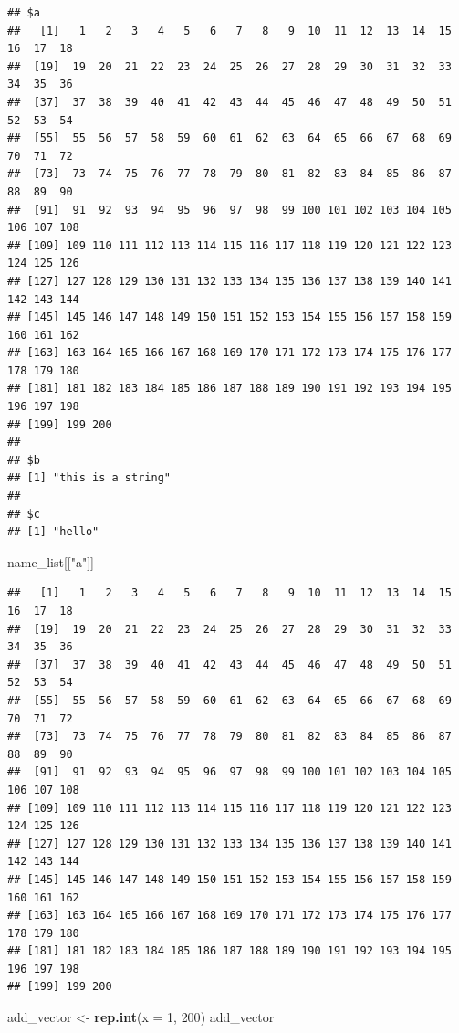 \documentclass[]{article}
\newenvironment{Shaded}{\begin{snugshade}}{\end{snugshade}}
\newcommand{\DataTypeTok}[1]{\textcolor[rgb]{0.13,0.29,0.53}{#1}}
\newcommand{\DecValTok}[1]{\textcolor[rgb]{0.00,0.00,0.81}{#1}}
\newcommand{\KeywordTok}[1]{\textcolor[rgb]{0.13,0.29,0.53}{\textbf{#1}}}
\newcommand{\NormalTok}[1]{#1}
\newcommand{\StringTok}[1]{\textcolor[rgb]{0.31,0.60,0.02}{#1}}
\begin{document}
\begin{verbatim}
## $a
##   [1]   1   2   3   4   5   6   7   8   9  10  11  12  13  14  15  16  17  18
##  [19]  19  20  21  22  23  24  25  26  27  28  29  30  31  32  33  34  35  36
##  [37]  37  38  39  40  41  42  43  44  45  46  47  48  49  50  51  52  53  54
##  [55]  55  56  57  58  59  60  61  62  63  64  65  66  67  68  69  70  71  72
##  [73]  73  74  75  76  77  78  79  80  81  82  83  84  85  86  87  88  89  90
##  [91]  91  92  93  94  95  96  97  98  99 100 101 102 103 104 105 106 107 108
## [109] 109 110 111 112 113 114 115 116 117 118 119 120 121 122 123 124 125 126
## [127] 127 128 129 130 131 132 133 134 135 136 137 138 139 140 141 142 143 144
## [145] 145 146 147 148 149 150 151 152 153 154 155 156 157 158 159 160 161 162
## [163] 163 164 165 166 167 168 169 170 171 172 173 174 175 176 177 178 179 180
## [181] 181 182 183 184 185 186 187 188 189 190 191 192 193 194 195 196 197 198
## [199] 199 200
## 
## $b
## [1] "this is a string"
## 
## $c
## [1] "hello"
\end{verbatim}

\begin{Shaded}
\begin{Highlighting}[]
\NormalTok{name_list[[}\StringTok{"a"}\NormalTok{]]}
\end{Highlighting}
\end{Shaded}

\begin{verbatim}
##   [1]   1   2   3   4   5   6   7   8   9  10  11  12  13  14  15  16  17  18
##  [19]  19  20  21  22  23  24  25  26  27  28  29  30  31  32  33  34  35  36
##  [37]  37  38  39  40  41  42  43  44  45  46  47  48  49  50  51  52  53  54
##  [55]  55  56  57  58  59  60  61  62  63  64  65  66  67  68  69  70  71  72
##  [73]  73  74  75  76  77  78  79  80  81  82  83  84  85  86  87  88  89  90
##  [91]  91  92  93  94  95  96  97  98  99 100 101 102 103 104 105 106 107 108
## [109] 109 110 111 112 113 114 115 116 117 118 119 120 121 122 123 124 125 126
## [127] 127 128 129 130 131 132 133 134 135 136 137 138 139 140 141 142 143 144
## [145] 145 146 147 148 149 150 151 152 153 154 155 156 157 158 159 160 161 162
## [163] 163 164 165 166 167 168 169 170 171 172 173 174 175 176 177 178 179 180
## [181] 181 182 183 184 185 186 187 188 189 190 191 192 193 194 195 196 197 198
## [199] 199 200
\end{verbatim}

\begin{Shaded}
\begin{Highlighting}[]
\NormalTok{add_vector <-}\StringTok{ }\KeywordTok{rep.int}\NormalTok{(}\DataTypeTok{x =} \DecValTok{1}\NormalTok{, }\DecValTok{200}\NormalTok{)}
\NormalTok{add_vector}
\end{Highlighting}
\end{Shaded}
\end{document}
